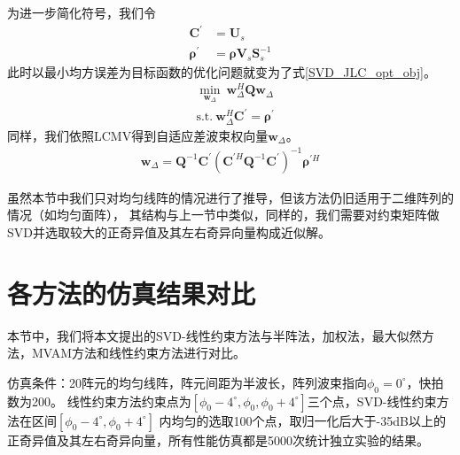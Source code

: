 \documentclass[master]{thesis-uestc}
\begin{document}
为进一步简化符号，我们令
\begin{subequations}
    \begin{align}
        \bm{C}^\prime &= \bm{U}_s \\
        \bm{\rho}^\prime &= \bm{\rho}\bm{V}_s\bm{S}_s^{-1}
    \end{align}
\end{subequations}
此时以最小均方误差为目标函数的优化问题就变为了式\eqref{SVD_JLC_opt_obj}。
\begin{equation}\label{SVD_JLC_opt_obj}
    \begin{aligned}
        &\min_{\bm{w}_\Delta} ~ \bm{w}^H_\Delta\bm{Q}\bm{w}_{\Delta} \\
        &\text{s.t.} ~ \bm{w}^H_\Delta\bm{C}^\prime = \bm{\rho}^\prime
    \end{aligned}
\end{equation}
同样，我们依照LCMV得到自适应差波束权向量$\bm{w}_\Delta$。
\begin{equation}
    \begin{aligned}
        \bm{w}_{\Delta} = \bm{Q}^{-1}\bm{C}^\prime
        \left(\bm{C}^{\prime H}\bm{Q}^{-1}\bm{C}^\prime\right)^{-1}\bm{\rho}^{\prime H}
    \end{aligned}
\end{equation}

虽然本节中我们只对均匀线阵的情况进行了推导，但该方法仍旧适用于二维阵列的情况（如均匀面阵），
其结构与上一节中类似，同样的，我们需要对约束矩阵做SVD并选取较大的正奇异值及其左右奇异向量构成近似解。

\section{各方法的仿真结果对比}
本节中，我们将本文提出的SVD-线性约束方法与半阵法，加权法，最大似然方法，MVAM方法和线性约束方法进行对比。

仿真条件：20阵元的均匀线阵，阵元间距为半波长，阵列波束指向$\phi_0=0^\circ$，快拍数为200。
线性约束方法约束点为$[\phi_0-4^\circ,\phi_0,\phi_0+4^\circ]$三个点，SVD-线性约束方法在区间$[\phi_0-4^\circ,\phi_0+4^\circ]$
内均匀的选取100个点，取归一化后大于-35dB以上的正奇异值及其左右奇异向量，所有性能仿真都是5000次统计独立实验的结果。
\end{document}
